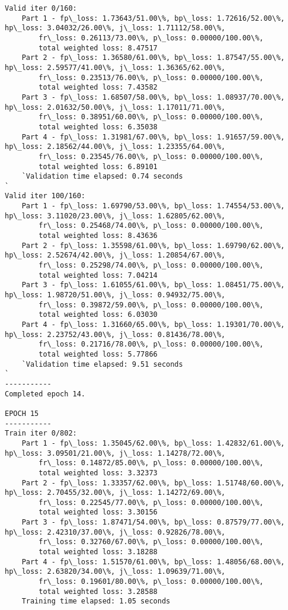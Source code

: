 \documentclass[11pt]{article}
\begin{document}
\begin{Verbatim}[commandchars=\\\{\}]
Valid iter 0/160:
	Part 1 - fp\_loss: 1.73643/51.00\%, bp\_loss: 1.72616/52.00\%, hp\_loss: 3.04032/26.00\%, j\_loss: 1.71112/58.00\%, 
		fr\_loss: 0.26113/73.00\%, p\_loss: 0.00000/100.00\%, 
		total weighted loss: 8.47517
	Part 2 - fp\_loss: 1.36580/61.00\%, bp\_loss: 1.87547/55.00\%, hp\_loss: 2.59577/41.00\%, j\_loss: 1.36365/62.00\%, 
		fr\_loss: 0.23513/76.00\%, p\_loss: 0.00000/100.00\%, 
		total weighted loss: 7.43582
	Part 3 - fp\_loss: 1.68507/58.00\%, bp\_loss: 1.08937/70.00\%, hp\_loss: 2.01632/50.00\%, j\_loss: 1.17011/71.00\%, 
		fr\_loss: 0.38951/60.00\%, p\_loss: 0.00000/100.00\%, 
		total weighted loss: 6.35038
	Part 4 - fp\_loss: 1.31981/67.00\%, bp\_loss: 1.91657/59.00\%, hp\_loss: 2.18562/44.00\%, j\_loss: 1.23355/64.00\%, 
		fr\_loss: 0.23545/76.00\%, p\_loss: 0.00000/100.00\%, 
		total weighted loss: 6.89101
	`Validation time elapsed: 0.74 seconds
`
Valid iter 100/160:
	Part 1 - fp\_loss: 1.69790/53.00\%, bp\_loss: 1.74554/53.00\%, hp\_loss: 3.11020/23.00\%, j\_loss: 1.62805/62.00\%, 
		fr\_loss: 0.25468/74.00\%, p\_loss: 0.00000/100.00\%, 
		total weighted loss: 8.43636
	Part 2 - fp\_loss: 1.35598/61.00\%, bp\_loss: 1.69790/62.00\%, hp\_loss: 2.52674/42.00\%, j\_loss: 1.20854/67.00\%, 
		fr\_loss: 0.25298/74.00\%, p\_loss: 0.00000/100.00\%, 
		total weighted loss: 7.04214
	Part 3 - fp\_loss: 1.61055/61.00\%, bp\_loss: 1.08451/75.00\%, hp\_loss: 1.98720/51.00\%, j\_loss: 0.94932/75.00\%, 
		fr\_loss: 0.39872/59.00\%, p\_loss: 0.00000/100.00\%, 
		total weighted loss: 6.03030
	Part 4 - fp\_loss: 1.31660/65.00\%, bp\_loss: 1.19301/70.00\%, hp\_loss: 2.23752/43.00\%, j\_loss: 0.81436/78.00\%, 
		fr\_loss: 0.21716/78.00\%, p\_loss: 0.00000/100.00\%, 
		total weighted loss: 5.77866
	`Validation time elapsed: 9.51 seconds
`
-----------
Completed epoch 14.

EPOCH 15
-----------
Train iter 0/802:
	Part 1 - fp\_loss: 1.35045/62.00\%, bp\_loss: 1.42832/61.00\%, hp\_loss: 3.09501/21.00\%, j\_loss: 1.14278/72.00\%, 
		fr\_loss: 0.14872/85.00\%, p\_loss: 0.00000/100.00\%, 
		total weighted loss: 3.32373
	Part 2 - fp\_loss: 1.33357/62.00\%, bp\_loss: 1.51748/60.00\%, hp\_loss: 2.70455/32.00\%, j\_loss: 1.14272/69.00\%, 
		fr\_loss: 0.22545/77.00\%, p\_loss: 0.00000/100.00\%, 
		total weighted loss: 3.30156
	Part 3 - fp\_loss: 1.87471/54.00\%, bp\_loss: 0.87579/77.00\%, hp\_loss: 2.42310/37.00\%, j\_loss: 0.92826/78.00\%, 
		fr\_loss: 0.32760/67.00\%, p\_loss: 0.00000/100.00\%, 
		total weighted loss: 3.18288
	Part 4 - fp\_loss: 1.51570/61.00\%, bp\_loss: 1.48056/68.00\%, hp\_loss: 2.63820/34.00\%, j\_loss: 1.09639/71.00\%, 
		fr\_loss: 0.19601/80.00\%, p\_loss: 0.00000/100.00\%, 
		total weighted loss: 3.28588
	Training time elapsed: 1.05 seconds


\end{Verbatim}
\end{document}
